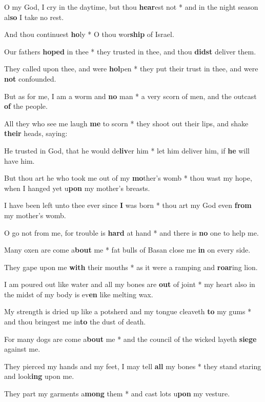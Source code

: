 \begin{multicols}{2}
	O my God, I cry in the daytime, but thou \textbf{hear}est not * and in the night season al\textbf{so} I take no rest.
	
	And thou continuest \textbf{ho}ly * O thou wor\textbf{ship} of Israel.
	
	Our fathers \textbf{hoped} in thee * they trusted in thee, and thou \textbf{didst} deliver them.
	
	They called upon thee, and were \textbf{hol}pen * they put their trust in thee, and were \textbf{not} confounded.
	
	But as for me, I am a worm and \textbf{no} man * a very scorn of men, and the outcast \textbf{of} the people.
	
	All they who see me laugh \textbf{me} to scorn * they shoot out their lips, and shake \textbf{their} heads, saying:
	
	He trusted in God, that he would de\textbf{liv}er him * let him deliver him, if \textbf{he} will have him.
	
	But thou art he who took me out of my \textbf{mo}ther's womb * thou wast my hope, when I hanged yet u\textbf{pon} my mother's breasts.
	
	I have been left unto thee ever since \textbf{I} was born * thou art my God even \textbf{from} my mother's womb.
	
	O go not from me, for trouble is \textbf{hard} at hand * and there is \textbf{no} one to help me.
	
	Many oxen are come a\textbf{bout} me * fat bulls of Basan close me \textbf{in} on every side.
	
	They gape upon me \textbf{with} their mouths * as it were a ramping and \textbf{roar}ing lion.
	
	I am poured out like water and all my bones are \textbf{out} of joint * my heart also in the midst of my body is ev\textbf{en} like melting wax.
	
	My strength is dried up like a potsherd and my tongue cleaveth \textbf{to} my gums * and thou bringest me in\textbf{to} the dust of death.
	
	For many dogs are come a\textbf{bout} me * and the council of the wicked layeth \textbf{siege} against me.
	
	They pierced my hands and my feet, I may tell \textbf{all} my bones * they stand staring and look\textbf{ing} upon me.
	
	They part my garments a\textbf{mong} them * and cast lots u\textbf{pon} my vesture.
	

\end{multicols}
